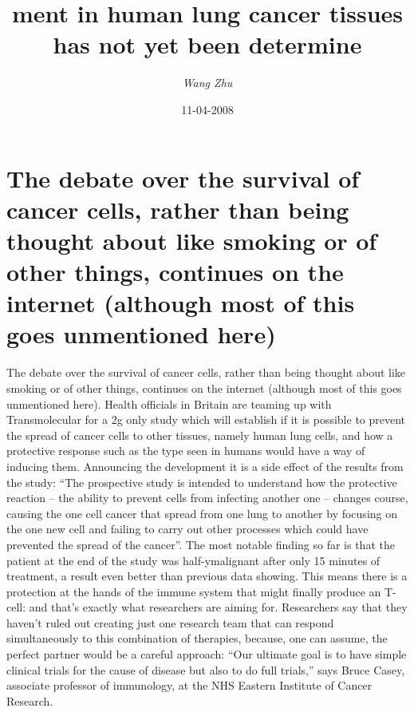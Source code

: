 \documentclass{article}%
\title{ment in human lung cancer tissues has not yet been determine}%
\author{\textit{Wang Zhu}}%
\date{11-04-2008}%
\begin{document}
%
\normalsize%
\maketitle%
\section{The debate over the survival of cancer cells, rather than being thought about like smoking or of other things, continues on the internet (although most of this goes unmentioned here)}%
\label{sec:Thedebateoverthesurvivalofcancercells,ratherthanbeingthoughtaboutlikesmokingorofotherthings,continuesontheinternet(althoughmostofthisgoesunmentionedhere)}%
The debate over the survival of cancer cells, rather than being thought about like smoking or of other things, continues on the internet (although most of this goes unmentioned here).\newline%
Health officials in Britain are teaming up with Transmolecular for a 2g only study which will establish if it is possible to prevent the spread of cancer cells to other tissues, namely human lung cells, and how a protective response such as the type seen in humans would have a way of inducing them.\newline%
Announcing the development it is a side effect of the results from the study: “The prospective study is intended to understand how the protective reaction – the ability to prevent cells from infecting another one – changes course, causing the one cell cancer that spread from one lung to another by focusing on the one new cell and failing to carry out other processes which could have prevented the spread of the cancer”.\newline%
The most notable finding so far is that the patient at the end of the study was half{-}ymalignant after only 15 minutes of treatment, a result even better than previous data showing.\newline%
This means there is a protection at the hands of the immune system that might finally produce an T{-}cell: and that’s exactly what researchers are aiming for.\newline%
Researchers say that they haven’t ruled out creating just one research team that can respond simultaneously to this combination of therapies, because, one can assume, the perfect partner would be a careful approach:\newline%
“Our ultimate goal is to have simple clinical trials for the cause of disease but also to do full trials,” says Bruce Casey, associate professor of immunology, at the NHS Eastern Institute of Cancer Research.\newline%
\end{document}
